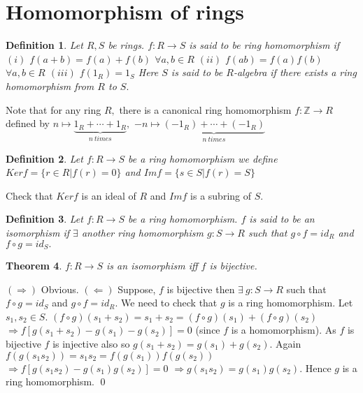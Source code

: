 \documentclass[11pt]{amsart}
\newtheorem{theorem}{Theorem}[section]
\newtheorem{definition}[theorem]{Definition}%
\newcommand{\ZZ}{\mathbb Z}
\begin{document}
\section{Homomorphism of rings}
\begin{definition}
Let $R,S$ be rings. $f:R \rightarrow S$ is said to be ring homomorphism if 
\newline $(i)$ $f(a+b)=f(a)+f(b)$ $\forall a,b\in R$
\newline $(ii)$ $f(ab)=f(a)f(b)$ $\forall a,b\in R$
\newline $(iii)$ $f(1_{R})=1_{S}$
\newline Here $S$ is said to be $R$-algebra if there exists a ring homomorphism from $R$ to $S.$
\end{definition}
Note that for any ring $R,$ there is a canonical ring homomorphism $f: {\ZZ} \rightarrow R$ defined by $n \mapsto \displaystyle\underbrace{1_{R}+\cdots +1_{R}}_{n~times},$ $-n \mapsto \displaystyle\underbrace{(-1_{R})+\cdots +(-1_{R})}_{n~times}$
\begin{definition}
Let $f: R \rightarrow S$ be a ring homomorphism we define $Kerf=\{r \in R|f(r)=0 \}$ and $Imf=\{s \in S|f(r)=S \}$
\end{definition}
Check that $Kerf$ is an ideal of $R$ and $Imf$ is a subring of $S.$
\begin{definition}
Let $f:R\rightarrow S$ be a ring homomorphism. $f$ is said to be an isomorphism if $\exists$ another ring homomorphism $g:S\rightarrow R$ such that $g\circ f=id_{R}$ and $f\circ g=id_{S}.$ 
\end{definition}
\begin{theorem}
$f:R\rightarrow S$ is an isomorphism iff $f$ is bijective.
\end{theorem}
\proof $(\Rightarrow)$ Obvious.
\newline $(\Leftarrow)$ Suppose, $f$ is bijective then $\exists~ g:S\rightarrow R$ such that $f\circ g=id_{S}$ and $g\circ f=id_{R}.$ We need to check that $g$ is a ring homomorphism. Let $s_{1},s_{2}\in S.$ $(f\circ g)(s_{1}+s_{2})=s_{1}+s_{2}=(f\circ g)(s_{1})+(f\circ g)(s_{2})$ $\Rightarrow f[g(s_{1}+s_{2})-g(s_{1})-g(s_{2})]=0$ (since $f$ is a homomorphism). As $f$ is bijective $f$ is injective also so $g(s_{1}+s_{2})=g(s_{1})+g(s_{2}).$ Again $f(g(s_{1}s_{2}))=s_{1}s_{2}=f(g(s_{1}))f(g(s_{2}))$ $\Rightarrow f[g(s_{1}s_{2})-g(s_{1})g(s_{2})]=0$ $\Rightarrow g(s_{1}s_{2})=g(s_{1})g(s_{2}).$ Hence $g$ is a ring homomorphism. \qed
\end{document}
